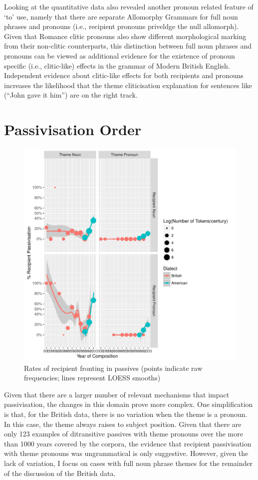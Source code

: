 	Looking at the quantitative data also revealed another pronoun related feature of `to' use, namely that there are separate Allomorphy Grammars for full noun phrases and pronouns (i.e., recipient pronouns priveldge the null allomorph). Given that Romance clitic pronouns also show different morphological marking from their non-clitic counterparts, this distinction between full noun phrases and pronouns can be viewed as additional evidence for the existence of pronoun specific (i.e., clitic-like) effects in the grammar of Modern British English. Independent evidence about clitic-like effects for both recipients and pronouns increases the likelihood that the theme cliticisation explanation for sentences like (``John gave it him'') are on the right track.

\section{Passivisation Order}
	\begin{figure}[p!]
		\includegraphics[width=.9\linewidth]{../images/rec-pas-graph}
		\caption{Rates of recipient fronting in passives (points indicate raw frequencies; lines represent LOESS smooths)}
		\label{fig:rec-pas}
	\end{figure}


	Given that there are a larger number of relevant mechanisms that impact passivisation, the changes in this domain prove more complex. One simplification is that, for the British data, there is no variation when the theme is a pronoun. In this case, the theme always raises to subject position. Given that there are only 123 examples of ditransitive passives with theme pronouns over the more than 1000 years covered by the corpora, the evidence that recipient passivisation with theme pronouns was ungrammatical is only suggestive. However, given the lack of variation, I focus on cases with full noun phrase themes for the remainder of the discussion of the British data.
	
